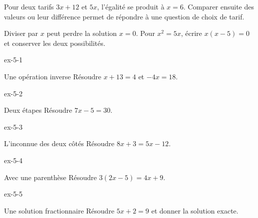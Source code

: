 \begin{exemple}Pour deux tarifs $3x+12$ et $5x$, l’égalité se produit à $x=6$. Comparer ensuite des valeurs ou leur différence permet de répondre à une question de choix de tarif.\end{exemple}
\begin{attention}Diviser par $x$ peut perdre la solution $x=0$. Pour $x^2=5x$, écrire $x(x-5)=0$ et conserver les deux possibilités.\end{attention}
\clearpage{}
\begin{blocLivre}{ex-5-1}\begin{exercice}[1]{Une opération inverse}
Résoudre $x+13=4$ et $-4x=18$.
\end{exercice}\end{blocLivre}
\begin{blocLivre}{ex-5-2}\begin{exercice}[1]{Deux étapes}
Résoudre $7x-5=30$.
\end{exercice}\end{blocLivre}
\begin{blocLivre}{ex-5-3}\begin{exercice}[1]{L’inconnue des deux côtés}
Résoudre $8x+3=5x-12$.
\end{exercice}\end{blocLivre}
\begin{blocLivre}{ex-5-4}\begin{exercice}[1]{Avec une parenthèse}
Résoudre $3(2x-5)=4x+9$.
\end{exercice}\end{blocLivre}
\begin{blocLivre}{ex-5-5}\begin{exercice}[1]{Une solution fractionnaire}
Résoudre $5x+2=9$ et donner la solution exacte.
\end{exercice}\end{blocLivre}

